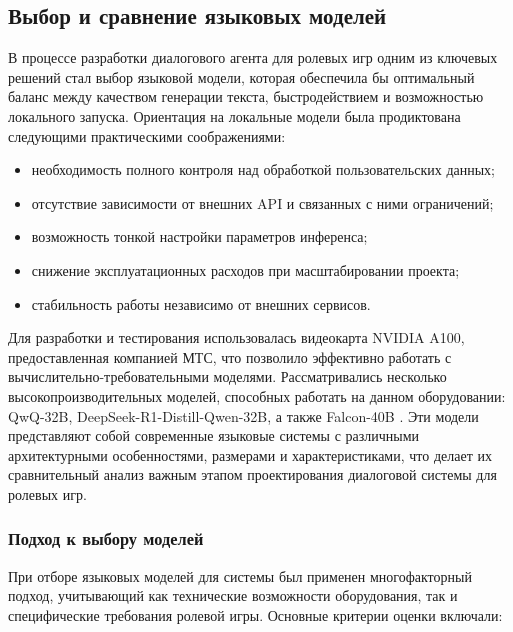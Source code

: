 \subsection{Выбор и сравнение языковых моделей}
В процессе разработки диалогового агента для ролевых игр одним из ключевых решений стал выбор языковой модели, которая обеспечила бы оптимальный баланс между качеством генерации текста, быстродействием и возможностью локального запуска. Ориентация на локальные модели была продиктована следующими практическими соображениями:
\begin{itemize}
\item необходимость полного контроля над обработкой пользовательских данных;
\item отсутствие зависимости от внешних API и связанных с ними ограничений;
\item возможность тонкой настройки параметров инференса;
\item снижение эксплуатационных расходов при масштабировании проекта;
\item стабильность работы независимо от внешних сервисов.
\end{itemize}

Для разработки и тестирования использовалась видеокарта NVIDIA A100, предоставленная компанией МТС, что позволило эффективно работать с вычислительно-требовательными моделями. Рассматривались несколько высокопроизводительных моделей, способных работать на данном оборудовании: QwQ-32B, DeepSeek-R1-Distill-Qwen-32B, а также Falcon-40B \cite{reddit_a100}. Эти модели представляют собой современные языковые системы с различными архитектурными особенностями, размерами и характеристиками, что делает их сравнительный анализ важным этапом проектирования диалоговой системы для ролевых игр.
\subsubsection{Подход к выбору моделей}

При отборе языковых моделей для системы был применен многофакторный подход, учитывающий как технические возможности оборудования, так и специфические требования ролевой игры. Основные критерии оценки включали:

